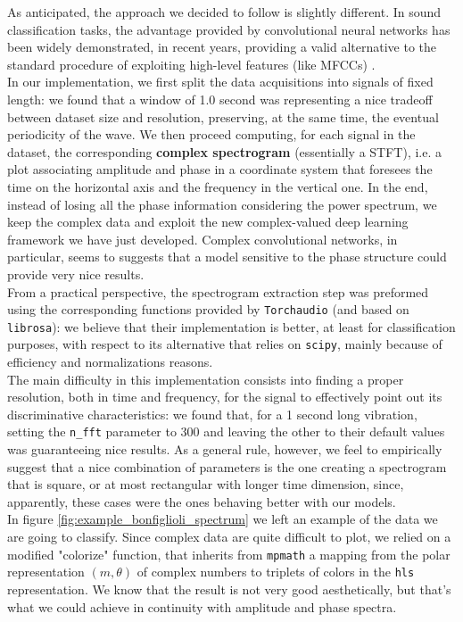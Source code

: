 \documentclass[../main.tex]{subfiles}
\begin{document}
As anticipated, the approach we decided to follow is slightly different. In sound classification tasks, the advantage provided by convolutional neural networks has been widely demonstrated, in recent years, providing a valid alternative to the standard procedure of exploiting high-level features (like MFCCs) \cite{piczak_cnn}.\\
In our implementation, we first split the data acquisitions into signals of fixed length: we found that a window of 1.0 second was representing a nice tradeoff between dataset size and resolution, preserving, at the same time, the eventual periodicity of the wave. We then proceed computing, for each signal in the dataset, the corresponding \textbf{complex spectrogram} (essentially a STFT), i.e. a plot associating amplitude and phase in a coordinate system that foresees the time on the horizontal axis and the frequency in the vertical one. In the end, instead of losing all the phase information considering the power spectrum, we keep the complex data and exploit the new complex-valued deep learning framework we have just developed. Complex convolutional networks, in particular, seems to suggests that a model sensitive to the phase structure could provide very nice results.\\
From a practical perspective, the spectrogram extraction step was preformed using the corresponding functions provided by \texttt{Torchaudio} (and based on \texttt{librosa}): we believe that their implementation is better, at least for classification purposes, with respect to its alternative that relies on \texttt{scipy}, mainly because of efficiency and normalizations reasons.\\
The main difficulty in this implementation consists into finding a proper resolution, both in time and frequency, for the signal to effectively point out its discriminative characteristics: we found that, for a 1 second long vibration, setting the \texttt{n\_fft} parameter to 300 and leaving the other to their default values was guaranteeing nice results. As a general rule, however, we feel to empirically suggest that a nice combination of parameters is the one creating a spectrogram that is square, or at most rectangular with longer time dimension, since, apparently, these cases were the ones behaving better with our models.\\
In figure \ref{fig:example_bonfiglioli_spectrum} we left an example of the data we are going to classify. Since complex data are quite difficult to plot, we relied on a modified "colorize" function, that inherits from \texttt{mpmath} a mapping from the polar representation $(m, \theta)$ of complex numbers to triplets of colors in the \texttt{hls} representation. We know that the result is not very good aesthetically, but that's what we could achieve in continuity with amplitude and phase spectra.
\end{document}
